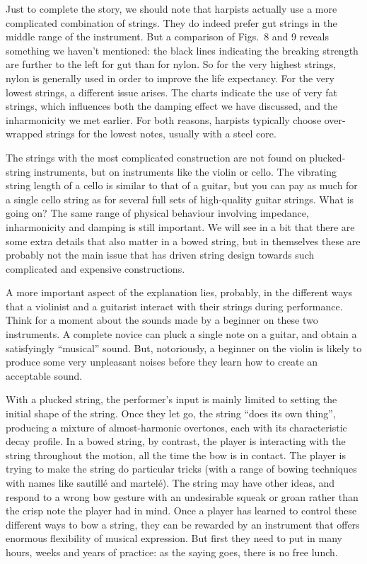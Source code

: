   Just to complete the story, we should note that harpists actually use a more 
  complicated combination of strings. They do indeed prefer gut strings in the 
  middle range of the instrument. But a comparison of Figs.\ 8 and 9 reveals 
  something we haven't mentioned: the black lines indicating the breaking 
  strength are further to the left for gut than for nylon. So for the very 
  highest strings, nylon is generally used in order to improve the life 
  expectancy. For the very lowest strings, a different issue arises. The charts 
  indicate the use of very fat strings, which influences both the damping 
  effect we have discussed, and the inharmonicity we met earlier. For both 
  reasons, harpists typically choose over-wrapped strings for the lowest notes, 
  usually with a steel core. 


  The strings with the most complicated construction are not found on 
  plucked-string instruments, but on instruments like the violin or cello. The 
  vibrating string length of a cello is similar to that of a guitar, but you 
  can pay as much for a single cello string as for several full sets of 
  high-quality guitar strings. What is going on? The same range of physical 
  behaviour involving impedance, inharmonicity and damping is still important. 
  We will see in a bit that there are some extra details that also matter in a 
  bowed string, but in themselves these are probably not the main issue that 
  has driven string design towards such complicated and expensive 
  constructions. 

  A more important aspect of the explanation lies, probably, in the different 
  ways that a violinist and a guitarist interact with their strings during 
  performance. Think for a moment about the sounds made by a beginner on these 
  two instruments. A complete novice can pluck a single note on a guitar, and 
  obtain a satisfyingly “musical” sound. But, notoriously, a beginner on the 
  violin is likely to produce some very unpleasant noises before they learn how 
  to create an acceptable sound. 

  With a plucked string, the performer’s input is mainly limited to setting the 
  initial shape of the string. Once they let go, the string “does its own 
  thing”, producing a mixture of almost-harmonic overtones, each with its 
  characteristic decay profile. In a bowed string, by contrast, the player is 
  interacting with the string throughout the motion, all the time the bow is in 
  contact. The player is trying to make the string do particular tricks (with a 
  range of bowing techniques with names like sautillé and martelé). The string 
  may have other ideas, and respond to a wrong bow gesture with an undesirable 
  squeak or groan rather than the crisp note the player had in mind. Once a 
  player has learned to control these different ways to bow a string, they can 
  be rewarded by an instrument that offers enormous flexibility of musical 
  expression. But first they need to put in many hours, weeks and years of 
  practice: as the saying goes, there is no free lunch. 

